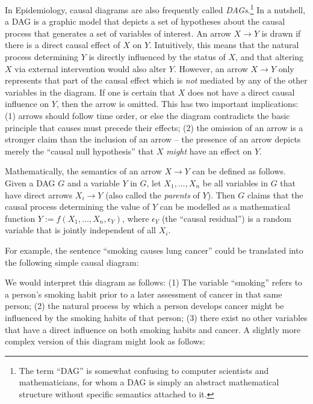\documentclass[a4paper,10pt]{article}
\begin{document}
In Epidemiology, causal diagrams are also frequently
called \emph{DAGs}.\footnote{The term ``DAG'' is
somewhat confusing to computer scientists and mathematicians, 
for whom a DAG is simply an abstract mathematical structure without specific semantics 
attached to it.} In a nutshell, a DAG is a graphic model that depicts a set of hypotheses
about the causal process that generates a set of variables of interest.
An arrow $X \to Y$ is drawn if there is a direct
causal effect of $X$ on $Y$. Intuitively, this means that
the natural process determining $Y$ is directly influenced by
the status of $X$, and that altering $X$ via external intervention 
would also alter $Y$. However, an arrow $X \to Y$ only represents that part
of the causal effect which is \emph{not} mediated by any of the other variables
in the diagram. If one is certain that $X$ does not
have a direct causal influence on $Y$, then the arrow is omitted.
This has two important implications: (1) arrows should follow time order,
 or else the diagram contradicts the basic principle that
causes must precede their effects; (2) the omission of an arrow is a stronger
claim than the inclusion of an arrow -- the presence of an arrow depicts
merely the ``causal null hypothesis'' that $X$ \emph{might} have an effect
on $Y$.

Mathematically, the semantics of an arrow $X \to Y$ can be defined as
follows. Given a DAG $G$ and a variable $Y$ in $G$, let $X_1,\ldots,X_n$
be all variables in $G$ that have direct arrows $X_i \to Y$ (also called the
\emph{parents} of $Y$). Then $G$ 
claims that the causal process determining the value of $Y$ can be
modelled as a mathematical function $Y := f(X_1,\ldots,X_n,\epsilon_Y)$,
where $\epsilon_Y$ (the ``causal residual'') is a random variable that
is jointly independent of all $X_i$.  

For example, the sentence ``smoking causes lung cancer'' could be translated
into the following simple causal diagram: 

\begin{center}
\end{center}

We would interpret this diagram as
follows: (1) The variable ``smoking'' refers to a person's smoking habit
prior to a later assessment of cancer in that same person;
(2) the natural process by which a person develops
cancer might be influenced by the smoking habits of that person; (3) there
exist no other variables that have a direct influence on both smoking 
habits and cancer. A slightly
more complex version of this diagram might look as follows:
\end{document}
